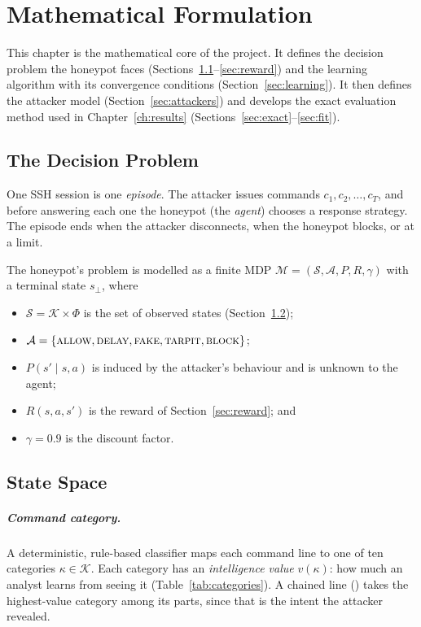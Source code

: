 \chapter{Mathematical Formulation}
\label{ch:formulation}

This chapter is the mathematical core of the project. It defines the decision problem the
honeypot faces (Sections~\ref{sec:mdp}--\ref{sec:reward}) and the learning algorithm with its
convergence conditions (Section~\ref{sec:learning}). It then defines the attacker model
(Section~\ref{sec:attackers}) and develops the exact evaluation method used in
Chapter~\ref{ch:results} (Sections~\ref{sec:exact}--\ref{sec:fit}).

\section{The Decision Problem}
\label{sec:mdp}

One SSH session is one \emph{episode}. The attacker issues commands $c_1, c_2, \dots, c_T$, and
before answering each one the honeypot (the \emph{agent}) chooses a response strategy. The
episode ends when the attacker disconnects, when the honeypot blocks, or at a limit.

\begin{definition}
The honeypot's problem is modelled as a finite MDP
$\mathcal{M} = (\mathcal{S}, \mathcal{A}, P, R, \gamma)$ with a terminal state $s_\bot$, where
\begin{itemize}
  \item $\mathcal{S} = \mathcal{K} \times \Phi$ is the set of observed states (Section~\ref{sec:state});
  \item $\mathcal{A} = \{\textsc{allow}, \textsc{delay}, \textsc{fake}, \textsc{tarpit}, \textsc{block}\}$;
  \item $P(s' \mid s, a)$ is induced by the attacker's behaviour and is unknown to the agent;
  \item $R(s, a, s')$ is the reward of Section~\ref{sec:reward}; and
  \item $\gamma = 0.9$ is the discount factor.
\end{itemize}
\end{definition}

\section{State Space}
\label{sec:state}

\paragraph{Command category.} A deterministic, rule-based classifier maps each command line to
one of ten categories $\kappa \in \mathcal{K}$. Each category has an \emph{intelligence value}
$v(\kappa)$: how much an analyst learns from seeing it (Table~\ref{tab:categories}). A chained
line () takes the highest-value category among
its parts, since that is the intent the attacker revealed.

